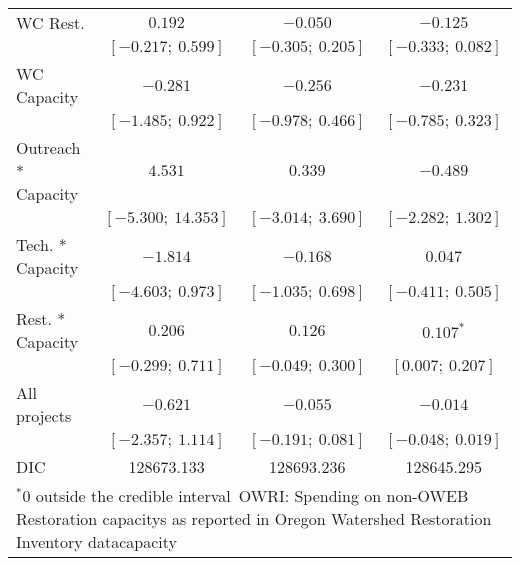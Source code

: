 \begin{table}
\begin{center}
\begin{tabular}{l c c c }
WC Rest.            & $0.192$             & $-0.050$            & $-0.125$            \\
                    & $[-0.217;\ 0.599]$  & $[-0.305;\ 0.205]$  & $[-0.333;\ 0.082]$  \\
WC Capacity         & $-0.281$            & $-0.256$            & $-0.231$            \\
                    & $[-1.485;\ 0.922]$  & $[-0.978;\ 0.466]$  & $[-0.785;\ 0.323]$  \\
Outreach * Capacity & $4.531$             & $0.339$             & $-0.489$            \\
                    & $[-5.300;\ 14.353]$ & $[-3.014;\ 3.690]$  & $[-2.282;\ 1.302]$  \\
Tech. * Capacity    & $-1.814$            & $-0.168$            & $0.047$             \\
                    & $[-4.603;\ 0.973]$  & $[-1.035;\ 0.698]$  & $[-0.411;\ 0.505]$  \\
Rest. * Capacity    & $0.206$             & $0.126$             & $0.107^{*}$         \\
                    & $[-0.299;\ 0.711]$  & $[-0.049;\ 0.300]$  & $[0.007;\ 0.207]$   \\
All projects        & $-0.621$            & $-0.055$            & $-0.014$            \\
                    & $[-2.357;\ 1.114]$  & $[-0.191;\ 0.081]$  & $[-0.048;\ 0.019]$  \\
\hline
DIC                 & 128673.133          & 128693.236          & 128645.295          \\
\hline
\multicolumn{4}{l}{\scriptsize{$^* 0$ outside the credible interval\
       OWRI: Spending on non-OWEB Restoration capacitys as reported in Oregon Watershed Restoration Inventory datacapacity}}
\end{tabular}
\label{table:capacitymods}
\end{center}
\end{table}
